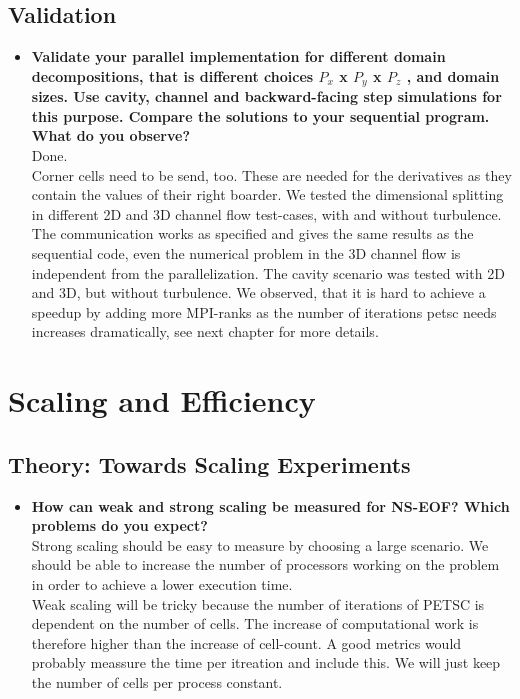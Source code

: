 \documentclass[a4paper]{article}
\begin{document}
\subsection{Validation}
\begin{itemize}
	\item \textbf{Validate your parallel implementation for different domain decompositions, that is different choices $P_x$ x $P_y$ x $P_z$ , and domain sizes. Use cavity, channel and backward-facing step simulations for this purpose. Compare the solutions to your sequential program. What do you observe?}\\
	Done.\\
	Corner cells need to be send, too. These are needed for the derivatives as they contain the values of their right boarder.
	We tested the dimensional splitting in different 2D and 3D channel flow test-cases, with and without turbulence. The communication works as specified and gives the same results as the sequential code, even the numerical problem in the 3D channel flow is independent from the parallelization. The cavity scenario was tested with 2D and 3D, but without turbulence.
	We observed, that it is hard to achieve a speedup by adding more MPI-ranks as the number of iterations petsc needs increases dramatically, see next chapter for more details.
	
\end{itemize}

\section{Scaling and Efficiency}
\subsection{Theory: Towards Scaling Experiments}
\begin{itemize}
	\item \textbf{How can weak and strong scaling be measured for NS-EOF? Which problems do you expect?}\\
	Strong scaling should be easy to measure by choosing a large scenario. We should be able to increase the number of processors working on the problem in order to achieve a lower execution time.\\
	Weak scaling will be tricky because the number of iterations of PETSC is dependent on the number of cells. The increase of computational work is therefore higher than the increase of cell-count. A good metrics would probably meassure the time per itreation and include this. We will just keep the number of cells per process constant. \\
\end{itemize}
\end{document}
